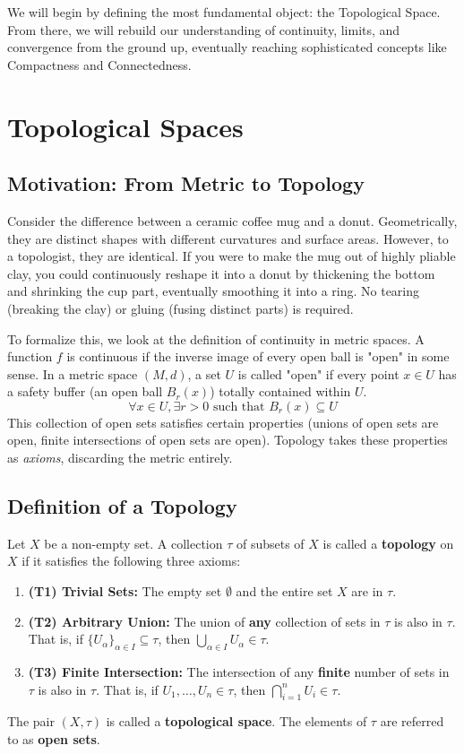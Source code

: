 \documentclass[oneside]{book}
\begin{document}
We will begin by defining the most fundamental object: the Topological Space. From there, we will rebuild our understanding of continuity, limits, and convergence from the ground up, eventually reaching sophisticated concepts like Compactness and Connectedness.

\section{Topological Spaces}

\subsection{Motivation: From Metric to Topology}

Consider the difference between a ceramic coffee mug and a donut. Geometrically, they are distinct shapes with different curvatures and surface areas. However, to a topologist, they are identical. If you were to make the mug out of highly pliable clay, you could continuously reshape it into a donut by thickening the bottom and shrinking the cup part, eventually smoothing it into a ring. No tearing (breaking the clay) or gluing (fusing distinct parts) is required.

To formalize this, we look at the definition of continuity in metric spaces. A function $f$ is continuous if the inverse image of every open ball is "open" in some sense. In a metric space $(M, d)$, a set $U$ is called "open" if every point $x \in U$ has a safety buffer (an open ball $B_r(x)$) totally contained within $U$.
\[ \forall x \in U, \exists r > 0 \text{ such that } B_r(x) \subseteq U \]
This collection of open sets satisfies certain properties (unions of open sets are open, finite intersections of open sets are open). Topology takes these properties as \textit{axioms}, discarding the metric entirely.

\subsection{Definition of a Topology}

\begin{definition}
Let $X$ be a non-empty set. A collection $\tau$ of subsets of $X$ is called a \textbf{topology} on $X$ if it satisfies the following three axioms:
\begin{enumerate}
    \item \textbf{(T1) Trivial Sets:} The empty set $\emptyset$ and the entire set $X$ are in $\tau$.
    \item \textbf{(T2) Arbitrary Union:} The union of \textbf{any} collection of sets in $\tau$ is also in $\tau$. That is, if $\{U_\alpha\}_{\alpha \in I} \subseteq \tau$, then $\bigcup_{\alpha \in I} U_\alpha \in \tau$.
    \item \textbf{(T3) Finite Intersection:} The intersection of any \textbf{finite} number of sets in $\tau$ is also in $\tau$. That is, if $U_1, \dots, U_n \in \tau$, then $\bigcap_{i=1}^n U_i \in \tau$.
\end{enumerate}
The pair $(X, \tau)$ is called a \textbf{topological space}. The elements of $\tau$ are referred to as \textbf{open sets}.
\end{definition}
\end{document}
